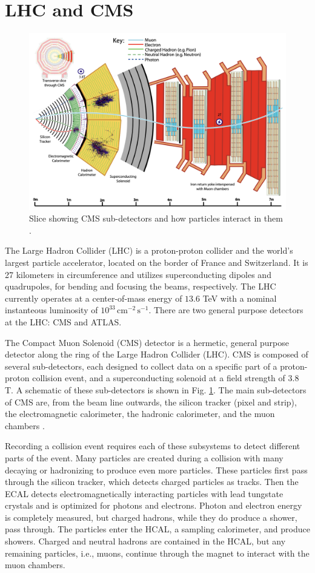 \documentclass[12pt]{article}
\begin{document}
\section{LHC and CMS}
\begin{figure}
   \centering
   \includegraphics[width=0.55\linewidth]{figures/CMSslice_whiteBackground.png}
   \caption{Slice showing CMS sub-detectors and how particles interact in them \cite{particle_flow_2017}.}
   \label{fig:cms-subdetectors}
\end{figure}

The Large Hadron Collider (LHC) is a proton-proton collider and the world's largest particle accelerator, located on the border of France and Switzerland. It is 27 kilometers in circumference and utilizes superconducting dipoles and quadrupoles, for bending and focusing the beams, respectively. The LHC currently operates at a center-of-mass energy of $13.6$ TeV with a nominal instanteous luminosity of $10^{33}\, \text{cm}^{-2}\, \text{s}^{-1}$. There are two general purpose detectors at the LHC: CMS and ATLAS.\par

The Compact Muon Solenoid (CMS) detector is a hermetic, general purpose detector along the ring of the Large Hadron Collider (LHC). CMS is composed of several sub-detectors, each designed to collect data on a specific part of a proton-proton collision event, and a superconducting solenoid at a field strength of $3.8$ T. A schematic of these sub-detectors is shown in Fig. \ref{fig:cms-subdetectors}. The main sub-detectors of CMS are, from the beam line outwards, the silicon tracker (pixel and strip), the electromagnetic calorimeter, the hadronic calorimeter, and the muon chambers \cite{CMS_Collaboration_2008}.\par

Recording a collision event requires each of these subsystems to detect different parts of the event. Many particles are created during a collision with many decaying or hadronizing to produce even more particles. These particles first pass through the silicon tracker, which detects charged particles as tracks. Then the ECAL detects electromagnetically interacting particles with lead tungstate crystals and is optimized for photons and electrons. Photon and electron energy is completely measured, but charged hadrons, while they do produce a shower, pass through. The particles enter the HCAL, a sampling calorimeter, and produce showers. Charged and neutral hadrons are contained in the HCAL, but any remaining particles, i.e., muons, continue through the magnet to interact with the muon chambers.\par
\end{document}
